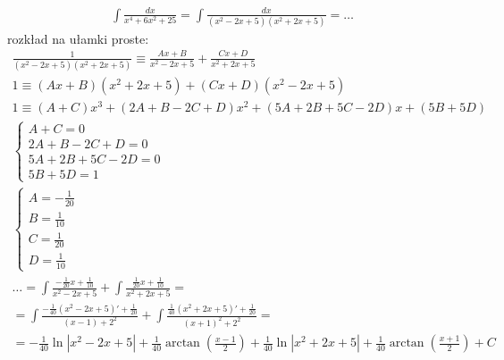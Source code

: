 
\begin{gather*}\int \frac{dx}{x^4+6x^2+25} = \int \frac{dx}{(x^2-2x+5)(x^2+2x+5)} = \ldots\end{gather*}
rozkład na ułamki proste:
\begin{gather*}\frac{1}{(x^2-2x+5)(x^2+2x+5)} \equiv \frac{Ax+B}{x^2-2x+5}+\frac{Cx+D}{x^2+2x+5} \\
1 \equiv (Ax+B)(x^2+2x+5)+(Cx+D)(x^2-2x+5) \\
1 \equiv (A+C)x^3+(2A+B-2C+D)x^2+(5A+2B+5C-2D)x+(5B+5D) \\
\begin{cases} A+C=0 \\ 2A+B-2C+D=0 \\ 5A+2B+5C-2D=0 \\ 5B+5D=1 \end{cases} \\
\begin{cases} A=-\frac{1}{20} \\ B=\frac{1}{10} \\ C=\frac{1}{20} \\ D=\frac{1}{10} \end{cases} \\
\ldots = \int\frac{-\frac{1}{20}x+\frac{1}{10}}{x^2-2x+5}+\int \frac{\frac{1}{20}x+\frac{1}{10}}{x^2+2x+5} = \\
= \int\frac{-\frac{1}{40}(x^2-2x+5)'+\frac{1}{20}}{(x-1)+2^2}+\int \frac{\frac{1}{40}(x^2+2x+5)'+\frac{1}{20}}{(x+1)^2+2^2}  = \\
= -\frac{1}{40}\ln|x^2-2x+5|+\frac{1}{40}\arctan \left( \frac{x-1}{2} \right)+\frac{1}{40}\ln|x^2+2x+5|+\frac{1}{40}\arctan \left(\frac{x+1}{2} \right)+C \end{gather*}



